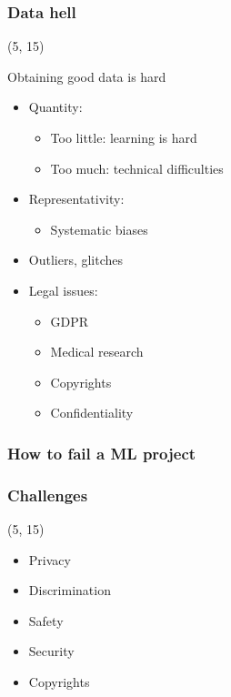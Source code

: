 \begin{frame}
  \frametitle{Data hell}

  \begin{textblock}{90}(5, 15)
    \begin{block}{Obtaining good data is hard}
      \begin{itemize}
      \item<2-> Quantity:
        \begin{itemize}
        \item Too little: learning is hard
        \item Too much: technical difficulties
        \end{itemize}
      \item<3-> Representativity:
        \begin{itemize}
        \item Systematic biases
        \end{itemize}
      \item<4-> Outliers, glitches
      \item<5-> Legal issues:
        \begin{itemize}
        \item GDPR
        \item Medical research
        \item Copyrights
        \item Confidentiality
        \end{itemize}
      \end{itemize}
    \end{block}
  \end{textblock}
\end{frame}


\begin{frame}
  \frametitle{How to fail a \ac{ML} project}

\end{frame}


\begin{frame}
  \frametitle{Challenges}

  \begin{textblock}{90}(5, 15)
    \begin{itemize}
    \item Privacy
    \item Discrimination
    \item Safety
    \item Security
    \item Copyrights
    \end{itemize}
  \end{textblock}
\end{frame}
